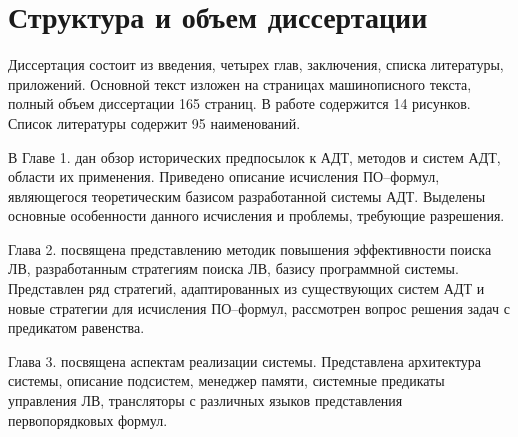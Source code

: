 


\section*{Структура и объем диссертации}
Диссертация состоит из введения, четырех глав, заключения, списка литературы, приложений. Основной текст изложен на \pageref{pg:main} страницах машинописного текста, полный объем диссертации 165 страниц. В работе содержится 14 рисунков. Список литературы содержит 95 наименований.

В Главе 1. дан обзор исторических предпосылок к АДТ, методов и систем АДТ, области их применения. Приведено описание исчисления ПО--формул, являющегося теоретическим базисом разработанной системы АДТ. Выделены основные особенности данного исчисления и проблемы, требующие разрешения.

Глава 2. посвящена представлению методик повышения эффективности поиска ЛВ, разработанным стратегиям поиска ЛВ, базису программной системы. Представлен ряд стратегий, адаптированных из существующих систем АДТ и новые стратегии для исчисления ПО--формул, рассмотрен вопрос решения задач с предикатом равенства.

Глава 3. посвящена аспектам реализации системы. Представлена архитектура системы, описание подсистем, менеджер памяти, системные предикаты управления ЛВ, трансляторы с различных языков представления первопорядковых формул.

